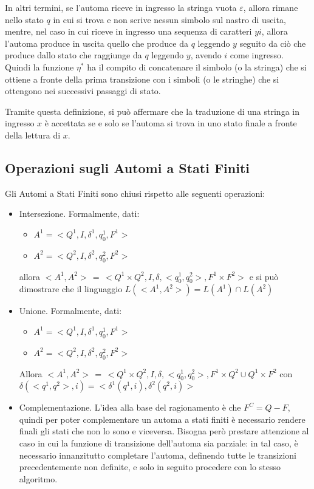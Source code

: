     In altri termini, se l'automa riceve in ingresso la stringa vuota \(\varepsilon\), allora rimane nello stato \(q\) in cui si trova e non scrive nessun simbolo sul nastro di uscita, mentre, nel caso in cui riceve in ingresso una sequenza di caratteri \(yi\), allora l’automa produce in uscita quello che produce da \(q\) leggendo \(y\) seguito da ciò che produce dallo stato che raggiunge da \(q\) leggendo \(y\), avendo \(i\) come ingresso. Quindi la funzione \(\eta^*\) ha il compito di concatenare il simbolo (o la stringa) che si ottiene a fronte della prima transizione con i simboli (o le stringhe) che si ottengono nei successivi passaggi di stato.
    
    Tramite questa definizione, si può affermare che la traduzione di una stringa in ingresso \(x\) è accettata se e solo se l'automa si trova in uno stato finale a fronte della lettura di \(x\).

  \subsection{Operazioni sugli Automi a Stati Finiti}
  Gli Automi a Stati Finiti sono chiusi rispetto alle seguenti operazioni:

  \begin{itemize}
    \item Intersezione. Formalmente, dati: 
    \begin{itemize}
      \item \(A^1 =<Q^1, I, \delta^1, q_0^1, F^1>\)
      \item \(A^2 = <Q^2, I, \delta^2, q_0^2, F^2>\)
    \end{itemize}
    allora \(<A^1, A^2> \,=\, < Q^1 \times Q^2, I, \delta,<q_0^1,q_0^2>, F^1 \times F^2>\) e si può dimostrare che il linguaggio \(L(<A^1, A^2>) = L(A^1) \cap L(A^2)\)
    \item Unione. Formalmente, dati:
    \begin{itemize}
      \item \(A^1 =<Q^1, I, \delta^1, q_0^1, F^1>\)
      \item \(A^2 = <Q^2, I, \delta^2, q_0^2, F^2>\)
    \end{itemize}
    Allora \(<A^1, A^2> \,=\, < Q^1 \times Q^2, I, \delta,<q_0^1,q_0^2>, F^1 \times Q^2 \cup Q^1 \times F^2\) con \(\delta(<q^1, q^2>, i) = <\delta^1(q^1,i), \delta^2(q^2,i)>\)
    \item Complementazione. L'idea alla base del ragionamento è che \(F^C = Q - F\), quindi per poter complementare un automa a stati finiti è necessario rendere finali gli stati che non lo sono e viceversa. Bisogna però prestare attenzione al caso in cui la funzione di transizione dell'automa sia parziale: in tal caso, è necessario innanzitutto completare l'automa, definendo tutte le transizioni precedentemente non definite, e solo in seguito procedere con lo stesso algoritmo.
  \end{itemize}

